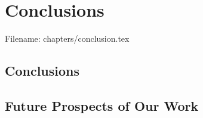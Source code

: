 \chapter{Conclusions}\label{ch:conclusion}
Filename: chapters/conclusion.tex
\section{Conclusions}


\section{Future Prospects of Our Work}
